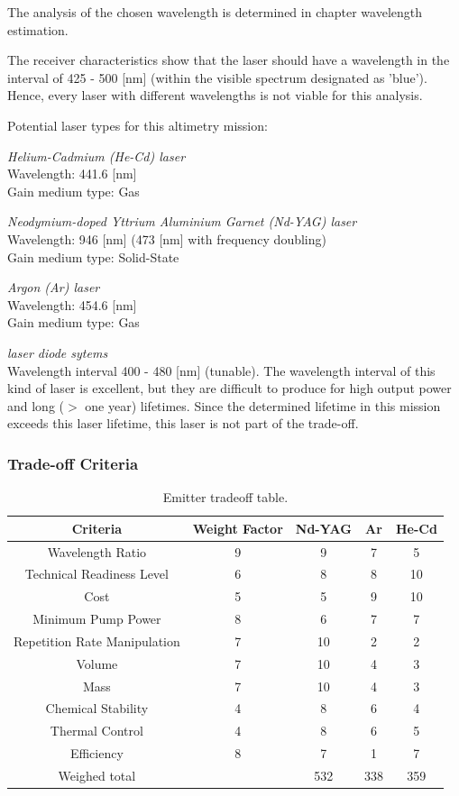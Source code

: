 The analysis of the chosen wavelength is determined in chapter wavelength estimation.

The receiver characteristics show that the laser should have a wavelength in the interval of 425 - 500 [nm] (within the visible spectrum designated as 'blue'). Hence, every \acs{laser} with different wavelengths is not viable for this analysis.

Potential \acs{laser} types for this altimetry mission:

\textit{Helium-Cadmium (He-Cd) \acs{laser}}\\
Wavelength: 441.6 [nm]\\
Gain medium type: Gas

\textit{Neodymium-doped Yttrium Aluminium Garnet (Nd-YAG) \acs{laser}}\\
Wavelength: 946 [nm] (473 [nm] with frequency doubling)\\
Gain medium type: Solid-State

\textit{Argon (Ar) \acs{laser}}\\	
Wavelength: 454.6 [nm]\\
Gain medium type: Gas

\textit{\acs{laser} diode sytems}\\
Wavelength interval 400 - 480 [nm] (tunable). The wavelength interval of this kind of \acs{laser} is excellent, but they are difficult to produce for high output power and long ($>$ one year) lifetimes. Since the determined lifetime in this mission exceeds this \acs{laser} lifetime, this \acs{laser} is not part of the trade-off.
	
	\subsubsection{Trade-off Criteria}

\begin{table}[h]
	\centering
		\begin{tabular}{c|c|c|c|c}
		 \textbf{Criteria} & \textbf{Weight Factor} & \textbf{Nd-YAG} & \textbf{Ar} & \textbf{He-Cd} \\ \hline \hline
		 Wavelength Ratio & 9 & 9 & 7 & 5 \\
		 Technical Readiness Level & 6 & 8 & 8 & 10 \\
		 Cost & 5 & 5 & 9 & 10 \\ 
		 Minimum Pump Power & 8 & 6 & 7 & 7 \\
		 Repetition Rate Manipulation & 7 & 10 & 2 & 2 \\ 
		 Volume & 7 & 10 & 4 & 3 \\ 
		 Mass & 7 & 10 & 4 & 3  \\
		 Chemical Stability & 4 & 8 & 6 & 4 \\
		 Thermal Control & 4 & 8 & 6 & 5 \\
		 Efficiency & 8 & 7 & 1 & 7 \\ \hline
		 Weighed total &   & 532 & 338 & 359
			
		\end{tabular}
	\caption{Emitter tradeoff table.}
	\label{table:emitterTradeTable}
\end{table}

